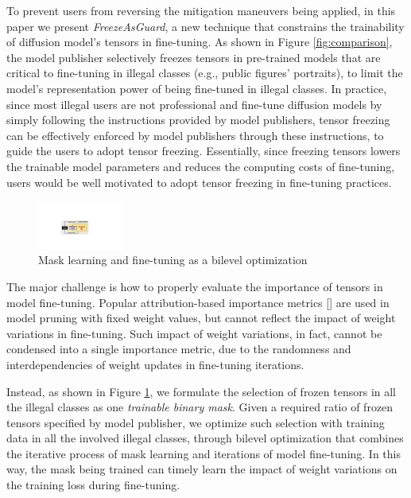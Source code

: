 \documentclass{article}
\begin{document}
To prevent users from reversing the mitigation maneuvers being applied, in this paper we present \emph{FreezeAsGuard}, a new technique that constrains the trainability of diffusion model's tensors in fine-tuning. As shown in Figure \ref{fig:comparison}, the model publisher selectively freezes tensors in pre-trained models that are critical to fine-tuning in illegal classes (e.g., public figures' portraits), to limit the model's representation power of being fine-tuned in illegal classes. In practice, since most illegal users are not professional and fine-tune diffusion models by simply following the instructions provided by model publishers, tensor freezing can be effectively enforced by model publishers through these instructions, to guide the users to adopt tensor freezing. Essentially, since freezing tensors lowers the trainable model parameters and reduces the computing costs of fine-tuning, users would be well motivated to adopt tensor freezing in fine-tuning practices.





\begin{figure}
	\centering
	\vspace{-0.1in}
	\includegraphics[width=0.25\textwidth]{figures/bilevel_opt.pdf}
	\vspace{-0.1in}
	\caption{\label{fig:bilevel_opt} Mask learning and fine-tuning as a bilevel optimization}
	\vspace{-0.1in}
\end{figure}

The major challenge is how to properly evaluate the importance of tensors in model fine-tuning. Popular attribution-based importance metrics [] are used in model pruning with fixed weight values, but cannot reflect the impact of weight variations in fine-tuning. Such impact of weight variations, in fact, cannot be condensed into a single importance metric, due to the randomness and interdependencies of weight updates in fine-tuning iterations. 

Instead, as shown in Figure \ref{fig:bilevel_opt}, we formulate the selection of frozen tensors in all the illegal classes as one \emph{trainable binary mask}. Given a required ratio of frozen tensors specified by model publisher, we optimize such selection with training data in all the involved illegal classes, through bilevel optimization that combines the iterative process of mask learning and iterations of model fine-tuning. In this way, the mask being trained can timely learn the impact of weight variations on the training loss during fine-tuning. 
\end{document}
